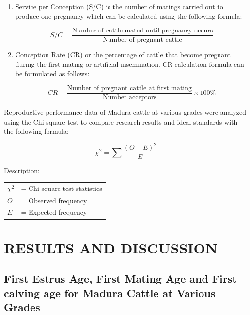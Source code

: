 \documentclass[9pt,article,twoside]{fapet-rho-class/fapet-rho}
\begin{document}
\begin{enumerate}
    \item Service per Conception (S/C) is the number of matings carried out to produce one pregnancy which can be calculated using the following formula:
    
    \begin{equation}
    S/C = \frac{\text{Number of cattle mated until pregnancy occurs}}{\text{Number of pregnant cattle}}
    \end{equation}
    
    \item Conception Rate (CR) or the percentage of cattle that become pregnant during the first mating or artificial insemination. CR calculation formula can be formulated as follows:
    
    \begin{equation}
    CR = \frac{\text{Number of pregnant cattle at first mating}}{\text{Number acceptors}} \times 100\%
    \end{equation}
\end{enumerate}

Reproductive performance data of Madura cattle at various grades were analyzed using the Chi-square test to compare research results and ideal standards with the following formula:

\begin{equation}
\chi^2 = \sum \frac{(O-E)^2}{E}
\end{equation}

\noindent Description:

\begin{tabular}{ll}
$\chi^2$ & = Chi-square test statistics \\
$O$ & = Observed frequency \\
$E$ & = Expected frequency \\
\end{tabular}

\section{RESULTS AND DISCUSSION}

\subsection{First Estrus Age, First Mating Age and First calving age for Madura Cattle at Various Grades}
\end{document}
